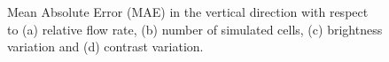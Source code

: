 \begin{figure}
\centering
\setlength{\figwidth}{0.5\columnwidth}
%
\caption{Mean Absolute Error (MAE) in the vertical direction with respect to (a) relative flow rate, (b) number of simulated cells, (c) brightness variation and (d) contrast variation.}
\label{fig_flow_graphs_synth}
\end{figure}

